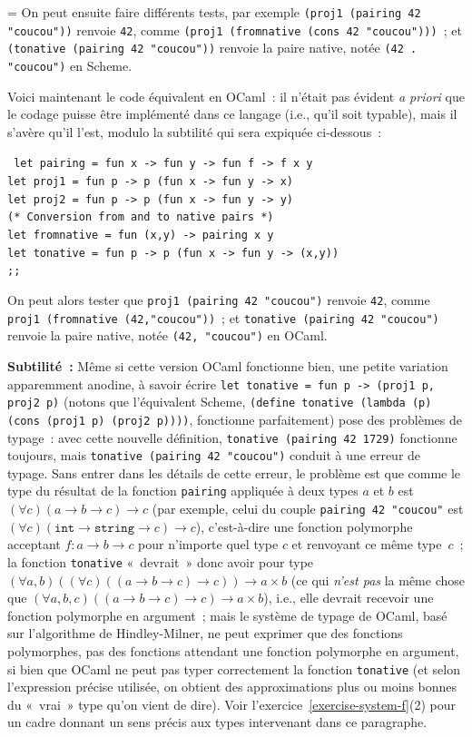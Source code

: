 \documentclass[12pt,a4paper]{article}
\theoremstyle{definition}
\newif\ifcorrige
\newenvironment{corrige}%
{\ifcorrige\relax\else\setbox0=\vbox\bgroup\fi%
\smallbreak\footnotesize\noindent{\underbar{\textit{Corrigé.}}\quad}}
{{\hbox{}\nobreak\hfill\checkmark}%
\ifcorrige\relax\else\egroup\fi\par}
\begin{document}
\begin{corrige}
On peut ensuite faire différents tests, par exemple \texttt{(proj1
  (pairing 42 "coucou"))} renvoie \texttt{42}, comme \texttt{(proj1
  (fromnative (cons 42 "coucou")))} ; et \texttt{(tonative (pairing 42
  "coucou"))} renvoie la paire native, notée \texttt{(42 . "coucou")}
en Scheme.

Voici maintenant le code équivalent en OCaml : il n'était pas évident
\textit{a priori} que le codage puisse être implémenté dans ce langage
(i.e., qu'il soit typable), mais il s'avère qu'il l'est, modulo la
subtilité qui sera expiquée ci-dessous :

\noindent\texttt{%
let pairing = fun x -> fun y -> fun f -> f x y\\
let proj1 = fun p -> p (fun x -> fun y -> x)\\
let proj2 = fun p -> p (fun x -> fun y -> y)\\
(* Conversion from and to native pairs *)\\
let fromnative = fun (x,y) -> pairing x y\\
let tonative = fun p -> p (fun x -> fun y -> (x,y))\\
;;
}

On peut alors tester que \texttt{proj1 (pairing 42 "coucou")} renvoie
\texttt{42}, comme \texttt{proj1 (fromnative (42,"coucou"))} ; et
\texttt{tonative (pairing 42 "coucou")} renvoie la paire native, notée
\texttt{(42, "coucou")} en OCaml.

\textbf{Subtilité :} Même si cette version OCaml fonctionne bien, une
petite variation apparemment anodine, à savoir écrire \texttt{let
  tonative = fun p -> (proj1 p, proj2 p)} (notons que l'équivalent
Scheme, \texttt{(define tonative (lambda (p) (cons (proj1 p) (proj2
  p))))}, fonctionne parfaitement) pose des problèmes de typage : avec
cette nouvelle définition, \texttt{tonative (pairing 42 1729)}
fonctionne toujours, mais \texttt{tonative (pairing 42 "coucou")}
conduit à une erreur de typage.  Sans entrer dans les détails de cette
erreur, le problème est que comme le type du résultat de la fonction
\texttt{pairing} appliquée à deux types $a$ et $b$ est $(\forall c) (a
\to b \to c) \to c$ (par exemple, celui du couple \texttt{pairing 42
  "coucou"} est $(\forall c) (\texttt{int} \to \texttt{string} \to c)
\to c$), c'est-à-dire une fonction polymorphe acceptant $f : a \to b
\to c$ pour n'importe quel type $c$ et renvoyant ce même type $c$ ; la
fonction \texttt{tonative} « devrait » donc avoir pour type $(\forall
a,b) ((\forall c) ((a \to b \to c) \to c)) \to a \times b$ (ce qui
\emph{n'est pas} la même chose que $(\forall a,b,c) ((a \to b \to c)
\to c) \to a \times b$), i.e., elle devrait recevoir une fonction
polymorphe en argument ; mais le système de typage de OCaml, basé sur
l'algorithme de Hindley-Milner, ne peut exprimer que des fonctions
polymorphes, pas des fonctions attendant une fonction polymorphe en
argument, si bien que OCaml ne peut pas typer correctement la fonction
\texttt{tonative} (et selon l'expression précise utilisée, on obtient
des approximations plus ou moins bonnes du « vrai » type qu'on vient
de dire).  Voir l'exercice \ref{exercise-system-f}(2) pour un cadre
donnant un sens précis aux types intervenant dans ce paragraphe.


\end{corrige}
\end{document}
